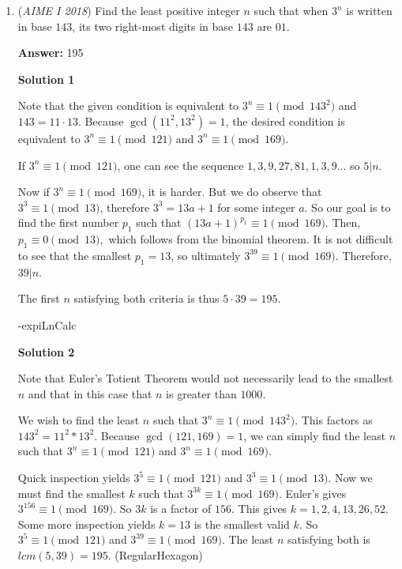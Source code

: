 \begin{enumerate}
 


	\item (\textit{AIME I 2018}) Find the least positive integer $n$ such that when $3^n$ is written in base $143$, its two right-most digits in base $143$ are $01$.


 
 \textbf{Answer: }195



\textbf{Solution 1}

Note that the given condition is equivalent to $3^n \equiv 1 \pmod{143^2}$ and $143=11\cdot 13$. Because $\gcd(11^2, 13^2) = 1$, the desired condition is equivalent to $3^n \equiv 1 \pmod{121}$ and $3^n \equiv 1 \pmod{169}$.

 If $3^n \equiv 1 \pmod{121}$, one can see the sequence $1, 3, 9, 27, 81, 1, 3, 9...$ so $5|n$.

 Now if $3^n \equiv 1 \pmod{169}$, it is harder. But we do observe that $3^3 \equiv 1 \pmod{13}$, therefore $3^3 = 13a + 1$ for some integer $a$. So our goal is to find the first number $p_1$ such that $(13a+1)^ {p_1} \equiv 1 \pmod{169}$. Then, $p_1 \equiv 0 \pmod{13},$ which follows from the binomial theorem. It is not difficult to see that the smallest $p_1=13$, so ultimately $3^{39} \equiv 1 \pmod{169}$. Therefore, $39|n$.

 The first $n$ satisfying both criteria is thus $5\cdot 39=\boxed{195}$.

 -expiLnCalc

 



\textbf{Solution 2}

Note that Euler's Totient Theorem would not necessarily lead to the smallest $n$ and that in this case that $n$ is greater than $1000$. 

 We wish to find the least $n$ such that $3^n \equiv 1 \pmod{143^2}$. This factors as $143^2=11^{2}*13^{2}$. Because $\gcd(121, 169) = 1$, we can simply find the least  $n$ such that $3^n \equiv 1 \pmod{121}$ and $3^n \equiv 1 \pmod{169}$.

 Quick inspection yields $3^5 \equiv 1 \pmod{121}$ and $3^3 \equiv 1 \pmod{13}$. Now we must find the smallest $k$ such that $3^{3k} \equiv 1 \pmod{169}$. Euler's gives $3^{156} \equiv 1 \pmod{169}$. So $3k$ is a factor of $156$. This gives $k=1,2, 4, 13, 26, 52$. Some more inspection yields $k=13$ is the smallest valid $k$. So $3^5 \equiv 1 \pmod{121}$ and $3^{39} \equiv 1 \pmod{169}$. The least $n$ satisfying both is $lcm(5, 39)=\boxed{195}$. (RegularHexagon)


\end{enumerate}
